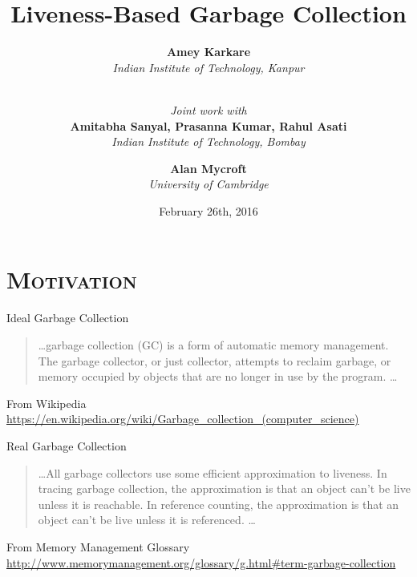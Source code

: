 \documentclass[xcolor=x11names,compress,mathserif]{beamer}
\renewcommand{\(}{\begin{columns}}
\renewcommand{\)}{\end{columns}}
\newcommand{\<}[1]{\begin{column}{#1}}
\renewcommand{\>}{\end{column}}
\begin{document}
\section{\scshape Motivation}
\begin{frame}
\title{Liveness-Based Garbage Collection}
\author{
        {\bf Amey Karkare}\\{\it Indian Institute of Technology, Kanpur}\\ \and
        \\ {\em Joint work with} \\
        {\bf Amitabha Sanyal, Prasanna Kumar, Rahul Asati}\\{\it Indian Institute of
          Technology, Bombay}\\ \and
        {\bf Alan Mycroft}\\{\it University of Cambridge}
}


\date{
	February 26th, 2016
}
\titlepage
\end{frame}


\begin{frame}{Ideal Garbage Collection}
  \begin{quote}
    \ldots garbage collection (GC) is a form of automatic memory management.  The  garbage  collector,  or  just collector,  attempts  to  reclaim
  garbage, or memory occupied by objects  that are {\red no longer in use} by
  the program. \ldots
  \end{quote}
  From Wikipedia\\ {\scriptsize \url{https://en.wikipedia.org/wiki/Garbage_collection_(computer_science)}}
\end{frame}

\begin{frame}{Real Garbage Collection}
  \begin{quote}
    \ldots All garbage collectors use some efficient {\red approximation to
    liveness}. In {tracing} garbage collection, the approximation is that
    an object can't be live unless it is {\red reachable}. In {reference
      counting}, the approximation is that an object can't be live unless
    it is {\red referenced}. 
    \ldots
  \end{quote}
  From Memory Management Glossary\\
  {\scriptsize \url{http://www.memorymanagement.org/glossary/g.html\#term-garbage-collection}}
\end{frame}
\end{document}
